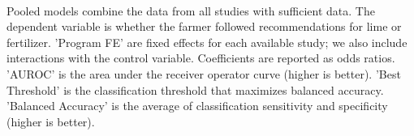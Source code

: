 \begin{table}[H] \centering
{}

\caption{Replicated Heterogeneity Logit Models: Lime}
\\ \parbox{0.79\linewidth}{\tiny Pooled models combine the data from all studies with sufficient data. The dependent variable is whether the farmer followed recommendations for lime or fertilizer. 'Program FE' are fixed effects for each available study; we also include interactions with the control variable. Coefficients are reported as odds ratios. 'AUROC' is the area under the receiver operator curve (higher is better). 'Best Threshold' is the classification threshold that maximizes balanced accuracy. 'Balanced Accuracy' is the average of classification sensitivity and specificity (higher is better).}
\end{table}
